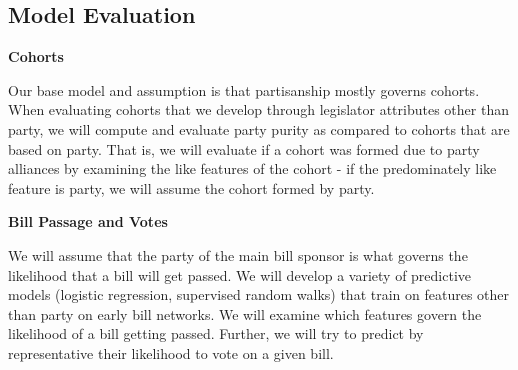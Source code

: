 \subsection{Model Evaluation}

\textbf{Cohorts}

Our base model and assumption is that partisanship mostly governs cohorts. 
When evaluating cohorts that we develop through legislator attributes other 
than party, we will compute and evaluate party purity as compared to cohorts 
that are based on party. That is, we will evaluate if a cohort was formed 
due to party alliances by examining the like features of the cohort - if the 
predominately like feature is party, we will assume the cohort formed by party.

\textbf{Bill Passage and Votes}

We will assume that the party of the main bill sponsor is what governs the 
likelihood that a bill will get passed. We will develop a variety of predictive 
models (logistic regression, supervised random walks) that train on features 
other than party on early bill networks. We will examine which features govern 
the likelihood of a bill getting passed. Further, we will try to predict by 
representative their likelihood to vote on a given bill.